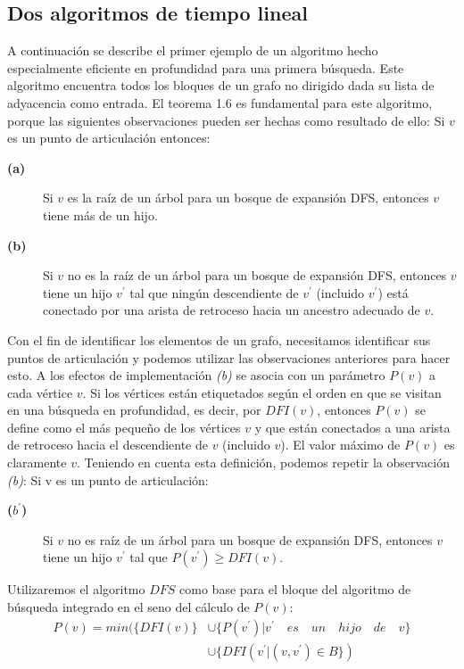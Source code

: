 \documentclass[10pt,a5paper]{book}
\begin{document}
\subsection{Dos algoritmos de tiempo lineal}
A continuación se describe el primer ejemplo de un algoritmo hecho especialmente eficiente en profundidad para una primera búsqueda. Este algoritmo encuentra todos los bloques de un grafo no dirigido dada su lista de adyacencia como entrada. El teorema 1.6 es fundamental para este algoritmo, porque las siguientes observaciones pueden ser hechas como resultado de ello:
Si $v$ es un punto de articulación entonces:
\begin{description}
\item[\textbf{(a)}] Si $v$ es la raíz de un árbol para un bosque de expansión DFS, entonces $v$ tiene más de un hijo.
\item[\textbf{(b)}] Si $v$ no es la raíz de un árbol para un bosque de expansión DFS, entonces $v$ tiene un hijo $v^{'}$ tal que ningún descendiente de $v^{'}$ (incluido $v^{'}$) está conectado por una arista de retroceso hacia un ancestro adecuado de $v$.
\end{description}
Con el fin de identificar los elementos de un grafo, necesitamos identificar sus puntos de articulación y podemos utilizar las observaciones anteriores para hacer esto. A los efectos de implementación \emph{(b)} se asocia con un parámetro $P(v)$ a cada vértice $v$. Si los vértices están etiquetados según el orden en que se visitan en una búsqueda en profundidad, es decir, por $DFI(v)$, entonces $P(v)$ se define como el más pequeño de los vértices $v$ y que están conectados a una arista de retroceso hacia el descendiente de $v$ (incluido $v$). El valor máximo de $P(v)$ es claramente $v$. Teniendo en cuenta esta definición, podemos repetir la observación \emph{(b)}:
Si v es un punto de articulación:
\begin{description}
\item[\textbf{($b^{'}$)}] Si $v$ no es raíz de un árbol para un bosque de expansión DFS, entonces $v$ tiene un hijo $v^{'}$ tal que $P(v^{'}) \ge DFI(v)$.
\end{description}
Utilizaremos el algoritmo $DFS$ como base para el bloque del algoritmo de búsqueda integrado en el seno del cálculo de $P(v)$:
\begin{subequations}
\begin{align}
P(v) = min(\{DFI(v)\} & \cup \{P(v^{'})| v^{'}\quad es\quad un\quad hijo\quad de\quad v\} \nonumber \\
& \cup \{DFI(v^{'}|(v,v^{'}) \in B\}) \nonumber
\end{align}
\end{subequations}
\end{document}

